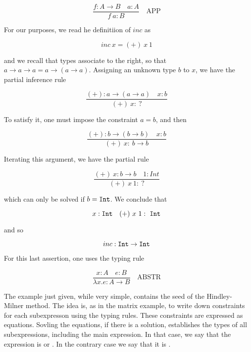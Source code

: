 \begin{equation}
\frac{f : A \to B \quad a: A}{f\ a : B} \quad \text{APP}
\end{equation}

For our purposes, we read he definitiion of $inc$ as 

\begin{equation}
inc\ x = (+)\ x\ 1
\end{equation}

and we recall that types associate to the right, so that $a \to a \to a = a \to (a \to a)$.  Assigning an unknown type $b$ to $x$, we have the partial inference rule

\begin{equation}
\frac{(+): a \to (a \to a) \quad x: b}{(+)\ x :\ ?}
\end{equation}

To satisfy it, one must impose the constraint $a = b$, and then 

\begin{equation}
\frac{(+): b \to (b \to b) \quad x: b}{(+)\ x :\ b \to b}
\end{equation}

Iterating this argument, we have the partial rule

\begin{equation}
\frac{(+)\ x: b \to b \quad 1: Int}{(+)\ x\ 1 :\ ?}
\end{equation}

which can only be solved if $b = {\tt Int}$.  We conclude that 

\begin{equation}
x : {\tt Int} \quad (+)\ x\ 1:\ {\tt Int}
\end{equation}

and so

\begin{equation}
inc : {\tt Int} \to {\tt Int}
\end{equation}

For this last assertion, one uses the typing rule

\begin{equation}
\frac{x: A\quad e:B}{\lambda x.e : A \to B} \quad \text{ABSTR}
\end{equation}

The example just given, while very simple, contains the seed of the Hindley-Milner method.  The idea is, as in the matrix example, to write down constraints for each subexpresson using the typing rules.  These constraints are expressed as equations.  Sovling the equations, if there is a solution, establishes the types of all subexpressions, including the main expression.  In that case, we say that the expression is  or .  In the contrary case we say that it is .

